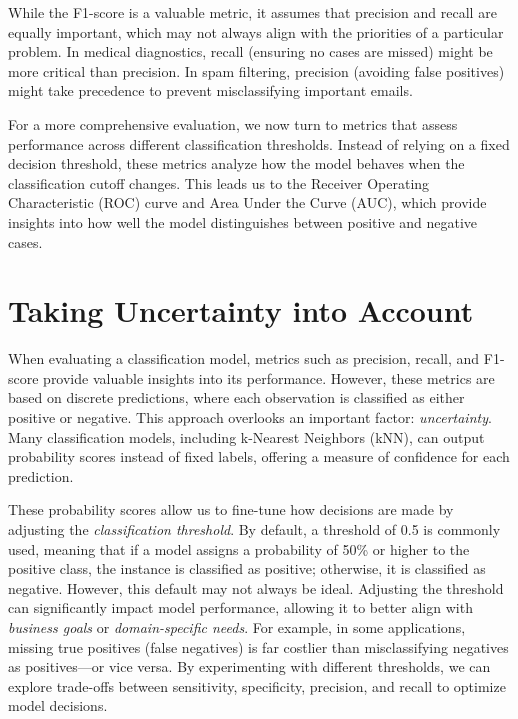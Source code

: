 \documentclass[
]{book}
\theoremstyle{definition}
\theoremstyle{definition}
\theoremstyle{definition}
\theoremstyle{definition}
\theoremstyle{remark}
\begin{document}
While the F1-score is a valuable metric, it assumes that precision and recall are equally important, which may not always align with the priorities of a particular problem. In medical diagnostics, recall (ensuring no cases are missed) might be more critical than precision. In spam filtering, precision (avoiding false positives) might take precedence to prevent misclassifying important emails.

For a more comprehensive evaluation, we now turn to metrics that assess performance across different classification thresholds. Instead of relying on a fixed decision threshold, these metrics analyze how the model behaves when the classification cutoff changes. This leads us to the Receiver Operating Characteristic (ROC) curve and Area Under the Curve (AUC), which provide insights into how well the model distinguishes between positive and negative cases.

\section{Taking Uncertainty into Account}\label{taking-uncertainty-into-account}

When evaluating a classification model, metrics such as precision, recall, and F1-score provide valuable insights into its performance. However, these metrics are based on discrete predictions, where each observation is classified as either positive or negative. This approach overlooks an important factor: \emph{uncertainty}. Many classification models, including k-Nearest Neighbors (kNN), can output probability scores instead of fixed labels, offering a measure of confidence for each prediction.

These probability scores allow us to fine-tune how decisions are made by adjusting the \emph{classification threshold}. By default, a threshold of 0.5 is commonly used, meaning that if a model assigns a probability of 50\% or higher to the positive class, the instance is classified as positive; otherwise, it is classified as negative. However, this default may not always be ideal. Adjusting the threshold can significantly impact model performance, allowing it to better align with \emph{business goals} or \emph{domain-specific needs}. For example, in some applications, missing true positives (false negatives) is far costlier than misclassifying negatives as positives---or vice versa. By experimenting with different thresholds, we can explore trade-offs between sensitivity, specificity, precision, and recall to optimize model decisions.
\end{document}
